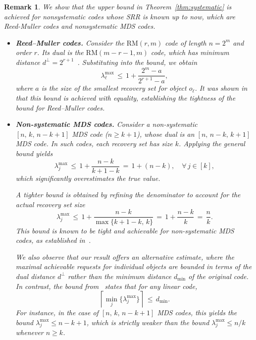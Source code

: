 \documentclass[conference,letterpaper]{IEEEtran}
\newtheorem{remark}{Remark}
\begin{document}
\begin{remark}\label{remark:verify}
We show that the upper bound in Theorem~\ref{thm:systematic} is achieved for nonsystematic codes whose SRR is known up to now, which are Reed-Muller codes and nonsystematic MDS codes.
\begin{itemize}
    \item \textbf{Reed--Muller codes.} Consider the $\mathrm{RM}(r, m)$ code of length $n = 2^m$ and order $r$. Its dual is the $\mathrm{RM}(m - r - 1, m)$ code, which has minimum distance $d^\perp = 2^{r+1}$~\cite{Coding:books/MacWilliamsS77}. Substituting into the bound, we obtain
    \[
    \lambda_{\ell}^{\max} \,\le\, 1 + \frac{2^m - a}{2^{r+1} - a},
    \]
    where $a$ is the size of the smallest recovery set for object $o_{\ell}$. It was shown in~\cite{SRR:preprint/arxiv/LySL25} that this bound is achieved with equality, establishing the tightness of the bound for Reed--Muller codes.
    \item \textbf{Non-systematic MDS codes.} Consider a non-systematic \( [n,\, k,\, n - k + 1] \) MDS code ($n\ge k+1$), whose dual is an \( [n,\, n - k,\, k + 1] \) MDS code. In such codes, each recovery set has size \( k \). Applying the general bound yields
\[
\lambda_j^{\max} \,\le\, 1 + \frac{n - k}{k + 1 - k} \,=\, 1 + (n - k), \quad \forall\, j \in [k],
\]
which significantly overestimates the true value.

A tighter bound is obtained by refining the denominator to account for the actual recovery set size
\[
\lambda_j^{\max} \,\le\, 1 + \frac{n - k}{\max\{k + 1 - k,\, k\}} \,=\, 1 + \frac{n - k}{k} \,=\, \frac{n}{k}.
\]
This bound is known to be tight and achievable for non-systematic MDS codes, as established in~\cite{SRR:lySV2025, SRR:journals/tit/AktasJKKS21}.

We also observe that our result offers an alternative estimate, where the maximal achievable requests for individual objects are bounded in terms of the dual distance \( d^{\perp} \) rather than the minimum distance \( d_{\min} \) of the original code. In contrast, the bound from~\cite[Corollary 2]{SRR:conf/isit/KazemiKS20} states that for any linear code,
\[
\left\lceil \min_j \{ \lambda_j^{\max} \} \right\rceil \,\le\, d_{\min}.
\]
For instance, in the case of \( [n,\, k,\, n - k + 1] \) MDS codes, this yields the bound \( \lambda_j^{\max} \le n - k + 1 \), which is strictly weaker than the bound \( \lambda_j^{\max} \le n/k \) whenever \( n \ge k \).
\end{itemize}
\end{remark}
\end{document}
